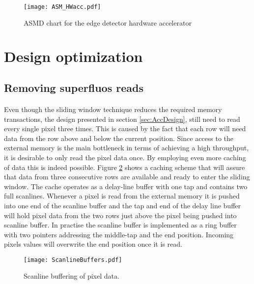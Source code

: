 \begin{figure}[H]
	\centering
	\texttt{[image: ASM\_HWacc.pdf]}
	\caption{ASMD chart for the edge detector hardware accelerator}
	\label{fig:ASM_HW}
\end{figure}

\section{Design optimization}
\label{sec:Optimization}
\subsection*{Removing superfluos reads}
\label{sec:memaccess}
\paragraph*{}
Even though the sliding window technique reduces the required memory transactions, the design presented in section \ref{sec:AccDesign}, still need to read every single pixel three times. This is caused by the fact that each row will need data from the row above and below the current position. Since access to the external memory is the main bottleneck in terms of achieving a high throughput, it is desirable to only read the pixel data once. By employing even more caching of data this is indeed possible. Figure \ref{fig:ScanlineBuffers} shows a caching scheme that will assure that data from three consecutive rows are available and ready to enter the sliding window. The cache operates as a delay-line buffer with one tap and contains two full scanlines. Whenever a pixel is read from the external memory it is pushed into one end of the scanline buffer and the tap and end of the delay line buffer will hold pixel data from the two rows just above the pixel being pushed into  scanline buffer. In practise the scanline buffer is implemented as a ring buffer with two pointers addressing the middle-tap and the end position. 
Incoming pixels values will overwrite the end position once it is read.

\begin{figure}[H]
	\centering
	\texttt{[image: ScanlineBuffers.pdf]}
	\caption{Scanline buffering of pixel data.}
	\label{fig:ScanlineBuffers}
\end{figure}

